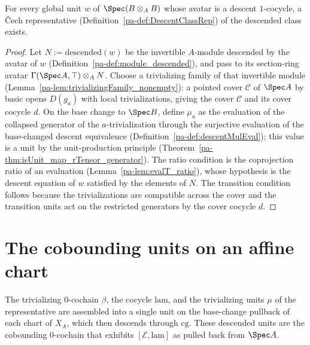 \begin{theorem}
  \label{pa-thm:descentClassRep}
  \leanok

  For every global unit \(w\) of \(\Spec(B \otimes_A B)\) whose avatar is a descent
  \(1\)-cocycle, a \v Cech representative (Definition~\ref{pa-def:DescentClassRep}) of the descended
  class exists.
\end{theorem}
\begin{proof}
  \leanok
  Let \(N := \mathrm{descended}(w)\) be the invertible \(A\)-module descended by the avatar of
  \(w\) (Definition~\ref{pa-def:module_descended}), and pass to its section-ring avatar
  \(\Gamma(\Spec A, \top) \otimes_A N\).  Choose a trivializing family of that invertible module
  (Lemma~\ref{pa-lem:trivializingFamily_nonempty}): a pointed cover \(\mathcal C\) of \(\Spec A\)
  by basic opens \(D(g_a)\) with local trivializations, giving the cover \(\mathcal C\) and its
  cover cocycle \(d\).  On the base change to \(\Spec B\), define \(\mu_a\) as the evaluation of
  the collapsed generator of the \(a\)-trivialization through the surjective evaluation of the
  base-changed descent equivalence (Definition~\ref{pa-def:descentMulEval}); this value is a unit
  by the unit-production principle (Theorem~\ref{pa-thm:isUnit_map_rTensor_generator}).  The ratio
  condition is the coprojection ratio of an evaluation (Lemma~\ref{pa-lem:evalT_ratio}), whose
  hypothesis is the descent equation of \(w\) satisfied by the elements of \(N\).  The
  transition condition follows because the trivializations are compatible across the cover and
  the transition units act on the restricted generators by the cover cocycle \(d\).
\end{proof}

\section{The cobounding units on an affine chart}
\label{pa-sec:kernelCobounding}

The trivializing \(0\)-cochain \(\beta\), the cocycle \(\mathrm{lam}\), and the trivializing
units \(\mu\) of the representative are assembled into a single unit on the base-change pullback
of each chart of \(X_A\), which then descends through \(\mathrm{cg}\).  These descended units are
the cobounding \(0\)-cochain that exhibits \([\mathcal E, \mathrm{lam}]\) as pulled back from
\(\Spec A\).


